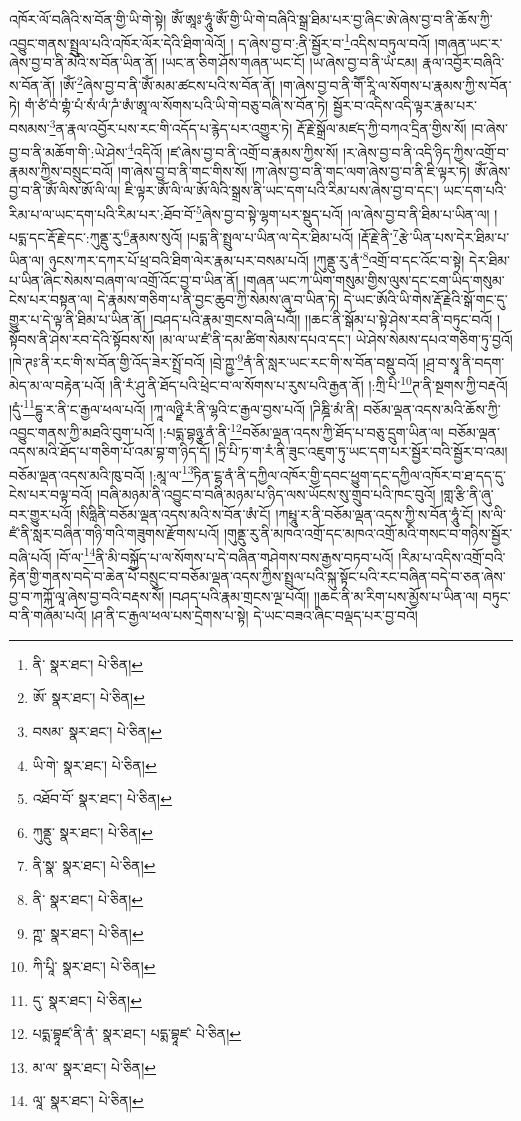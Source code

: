 འཁོར་ལོ་བཞིའི་ས་བོན་གྱི་ཡི་གེ་སྟེ། ཨོཾ་ཨཱཿ་ཧཱུཾ་ཨོཾ་གྱི་ཡི་གེ་བཞིའི་སྒྲ་ཐིམ་པར་བྱ་ཞིང་ཨེ་ཞེས་བྱ་བ་ནི་ཆོས་ཀྱི་འབྱུང་གནས་སྤྲུལ་པའི་འཁོར་ལོར་དེའི་ཐིག་ལེའོ། །
ད་ཞེས་བྱ་བ་:ནི་སྦྱོར་བ་\footnote{ནི་  སྣར་ཐང་།  པེ་ཅིན། }འདིས་བཏུལ་བའོ། །གཞན་ཡང་ར་ཞེས་བྱ་བ་ནི་མེའི་ས་བོན་ཡིན་ནོ། །ཡང་ན་ཅིག་ཤོས་གཞན་ཡང་ངོ། །ཡ་ཞེས་བྱ་བ་ནི་ཡཾ་ངམ། རྣལ་འབྱོར་བཞིའི་ས་བོན་ནོ། །ཨོཾ་\footnote{ཨོ་  སྣར་ཐང་།  པེ་ཅིན། }ཞེས་བྱ་བ་ནི་ཨོཾ་མམ་ཚངས་པའི་ས་བོན་ནོ། །ག་ཞེས་བྱ་བ་ནི་གཽ་རཱི་ལ་སོགས་པ་རྣམས་ཀྱི་ས་བོན་ཏེ། གཾ་ཙཾ་བཾ་གྷཾ་པཾ་སཾ་ལཾ་ཌཾ་ཨཾ་ཨཱ་ལ་སོགས་པའི་ཡི་གེ་བཅུ་བཞི་ས་བོན་ཏེ། སྦྱོར་བ་འདིས་འདི་ལྟར་རྣམ་པར་བསམས་\footnote{བསམ་  སྣར་ཐང་།  པེ་ཅིན། }ན་རྣལ་འབྱོར་པས་རང་གི་འདོད་པ་རྙེད་པར་འགྱུར་ཏེ། རྡོ་རྗེ་སྒྲོལ་མཛད་ཀྱི་བཀའ་དྲིན་གྱིས་སོ། །བ་ཞེས་བྱ་བ་ནི་མཆོག་གི་:ཡེ་ཤེས་\footnote{ཡི་གེ་  སྣར་ཐང་།  པེ་ཅིན། }འདིའོ། །ཛ་ཞེས་བྱ་བ་ནི་འགྲོ་བ་རྣམས་ཀྱིས་སོ། །ར་ཞེས་བྱ་བ་ནི་འདི་ཉིད་ཀྱིས་འགྲོ་བ་རྣམས་ཀྱིས་བསྲུང་བའོ། །ག་ཞེས་བྱ་བ་ནི་གང་གིས་སོ། །ཀ་ཞེས་བྱ་བ་ནི་གང་ལག་ཞེས་བྱ་བ་ནི་ཇི་ལྟར་ཏེ། ཨོཾ་ཞེས་བྱ་བ་ནི་ཨོཾ་ལིས་ཨོ་ལི་ལ། ཇི་ལྟར་ཨོཾ་ལི་ལ་ཨོ་ལིའི་སྒྲས་ནི་ཡང་དག་པའི་རིམ་པས་ཞེས་བྱ་བ་དང་། ཡང་དག་པའི་རིམ་པ་ལ་ཡང་དག་པའི་རིམ་པར་:ཐོབ་བོ་\footnote{འཐོབ་བོ་  སྣར་ཐང་།  པེ་ཅིན། }ཞེས་བྱ་བ་སྟེ་ལྷག་པར་སྡུད་པའོ། །ལ་ཞེས་བྱ་བ་ནི་ཐིམ་པ་ཡིན་ལ། །པདྨ་དང་རྡོ་རྗེ་དང་:ཀུནྡུ་རུ་\footnote{ཀུནྡུ་  སྣར་ཐང་།  པེ་ཅིན། }རྣམས་སུའོ། །པདྨ་ནི་སྤྲུལ་པ་ཡིན་ལ་དེར་ཐིམ་པའོ། །རྡོ་རྗེ་ནི་\footnote{ནི་སྣ་  སྣར་ཐང་།  པེ་ཅིན། }རྩེ་ཡིན་པས་དེར་ཐིམ་པ་ཡིན་ལ། ཉུངས་ཀར་དཀར་པོ་ཕྲ་བའི་ཐིག་ལེར་རྣམ་པར་བསམ་པའོ། །ཀུནྡུ་རུ་ནཾ་\footnote{ནི་  སྣར་ཐང་།  པེ་ཅིན། }འགྲོ་བ་དང་འོང་བ་སྟེ། དེར་ཐིམ་པ་ཡིན་ཞིང་སེམས་བཞག་ལ་འགྲོ་འོང་བྱ་བ་ཡིན་ནོ། །གཞན་ཡང་ཀ་ཡིག་གསུམ་གྱིས་ལུས་དང་ངག་ཡིད་གསུམ་ངེས་པར་བསྟན་ལ། དེ་རྣམས་གཅིག་པ་ནི་བྱང་ཆུབ་ཀྱི་སེམས་ཞུ་བ་ཡིན་ཏེ། དེ་ཡང་ཨོའི་ཡི་གེས་རྡོ་རྗེའི་སྒོ་གང་དུ་གྱུར་པ་དེ་ལྟ་ནི་ཐིམ་པ་ཡིན་ནོ། །བཤད་པའི་རྣམ་གྲངས་བཞི་པའོ།། །།ཆང་ནི་སྒོམ་པ་སྟེ་ཤེས་རབ་ནི་བཏུང་བའོ། །སྟོབས་ནི་ཤེས་རབ་དེའི་སྟོབས་སོ། །མ་ལ་ཡ་ཛཾ་ནི་དམ་ཚིག་སེམས་དཔའ་དང་། ཡེ་ཤེས་སེམས་དཔའ་གཅིག་ཏུ་བྱའོ། །ཁེ་ཊཿ་ནི་རང་གི་ས་བོན་གྱི་འོད་ཟེར་སྤྲོ་བའོ། །བྲེ་ཀྵྱ་\footnote{ཀྵ་  སྣར་ཐང་།  པེ་ཅིན། }ནཾ་ནི་སླར་ཡང་རང་གི་ས་བོན་བསྡུ་བའོ། །ཤྲ་བ་སྭཱ་ནི་བདག་མེད་མ་ལ་བརྟེན་པའོ། །ནི་རཾ་ཤུ་ནི་ཐོད་པའི་ཕྲེང་བ་ལ་སོགས་པ་རུས་པའི་རྒྱན་ནོ། །:ཀྲི་པི་\footnote{ཀི་པཱི་  སྣར་ཐང་།  པེ་ཅིན། }ཊ་ནི་སྔགས་ཀྱི་བརྡའོ། །དུཾ་\footnote{དུ་  སྣར་ཐང་།  པེ་ཅིན། }དྷུ་ར་ནི་ང་རྒྱལ་ཕལ་པའོ། །ཀཱ་ལཉྫི་རཾ་ནི་ལྷའི་ང་རྒྱལ་བྱས་པའོ། །ཌིཎྜི་མཾ་ནི། བཅོམ་ལྡན་འདས་མའི་ཆོས་ཀྱི་འབྱུང་གནས་ཀྱི་མཐའི་བུག་པའོ། །:པདྨ་བྷཉྩ་ནཾ་ནི་\footnote{པདྨ་བྷཱཛ་ནི་ནཾ་  སྣར་ཐང་། པདྨ་བྷཱཛ་  པེ་ཅིན། }བཅོམ་ལྡན་འདས་ཀྱི་ཐོད་པ་བཅུ་དྲུག་ཡིན་ལ། བཅོམ་ལྡན་འདས་མའི་ཐོད་པ་གཅིག་པོ་འམ་བྷ་ག་ཉིད་དོ། །ཏྲི་པི་ཏ་ག་རཾ་ནི་ཟུང་འཇུག་ཏུ་ཡང་དག་པར་སྦྱོར་བའི་སྦྱོར་བ་འམ། བཅོམ་ལྡན་འདས་མའི་ཁུ་བའོ། །:མཱ་ལ་\footnote{མ་ལ་  སྣར་ཐང་།  པེ་ཅིན། }ཏིན་ངྷ་ནཾ་ནི་དཀྱིལ་འཁོར་གྱི་དབང་ཕྱུག་དང་དཀྱིལ་འཁོར་བ་ཐ་དད་དུ་ངེས་པར་བལྟ་བའོ། །བཞི་མཉམ་ནི་འབྱུང་བ་བཞི་མཉམ་པ་ཉིད་ལས་ཡོངས་སུ་གྲུབ་པའི་ཁང་བུའོ། །གླ་རྩི་ནི་ཞུ་བར་གྱུར་པའོ། །སིཧླིནི་བཅོམ་ལྡན་འདས་མའི་ས་བོན་ཨཾ་ངོ། །ཀཔྤཱུ་ར་ནི་བཅོམ་ལྡན་འདས་ཀྱི་ས་བོན་ཧཱུཾ་ངོ། །ས་ལི་ཛཾ་ནི་སླར་བཞིན་གཉི་གའི་གཟུགས་རྫོགས་པའོ། །གུནྡུ་རུ་ནི་མཁའ་འགྲོ་དང་མཁའ་འགྲོ་མའི་གསང་བ་གཉིས་སྦྱོར་བཞི་པའོ། །བོ་ལ་\footnote{ལཱ་  སྣར་ཐང་།  པེ་ཅིན། }ནི་མི་བསྐྱོད་པ་ལ་སོགས་པ་དེ་བཞིན་གཤེགས་བས་རྒྱས་བཏབ་པའོ། །རིམ་པ་འདིས་འགྲོ་བའི་རྟེན་གྱི་གནས་བདེ་བ་ཆེན་པོ་བསྲུང་བ་བཅོམ་ལྡན་འདས་ཀྱིས་སྤྲུལ་པའི་སྐུ་སྟོང་པའི་རང་བཞིན་བདེ་བ་ཅན་ཞེས་བྱ་བ་ཀཀྐོ་ལཱ་ཞེས་བྱ་བའི་བརྡས་སོ། །བཤད་པའི་རྣམ་གྲངས་ལྔ་པའོ།། །།ཆང་ནི་མ་རིག་པས་མྱོས་པ་ཡིན་ལ། བཏུང་བ་ནི་གཞོམ་པའོ། །ཤ་ནི་ང་རྒྱལ་ཕལ་པས་དྲེགས་པ་སྟེ། དེ་ཡང་བཟའ་ཞིང་བལྡད་པར་བྱ་བའོ། 